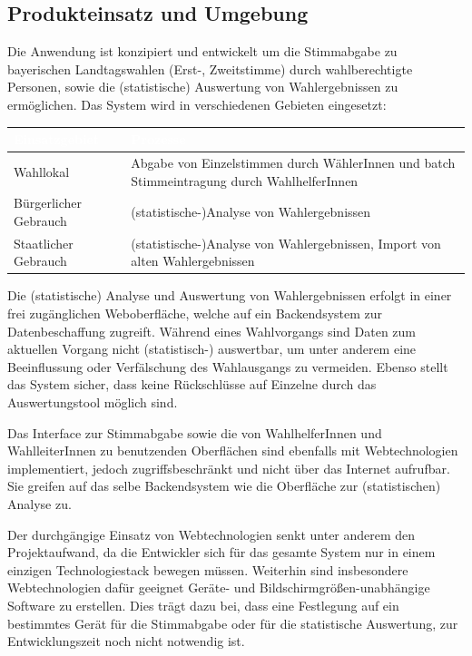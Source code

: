 \documentclass[a4paper,12pt]{article}
\begin{document}
\subsection{Produkteinsatz und Umgebung}
Die Anwendung ist konzipiert und entwickelt um die Stimmabgabe 
zu bayerischen Landtagswahlen (Erst-, Zweitstimme) durch wahlberechtigte
Personen, sowie die (statistische) Auswertung von Wahlergebnissen zu ermöglichen. 
%
Das System wird in verschiedenen Gebieten eingesetzt:

\begin{center}
\begin{tabular}{|m{5cm}|m{10cm}|}
	\hline
  \rowcolor{TUMBlue} \textcolor{white}{\textbf{Einsatzgebiet}} & \textcolor{white}{\textbf{Prozesse}} \\
  \hline
  Wahllokal & Abgabe von Einzelstimmen durch WählerInnen und batch Stimmeintragung durch WahlhelferInnen \\
	\hline
  Bürgerlicher Gebrauch & (statistische-)Analyse von Wahlergebnissen \\
  \hline
  Staatlicher Gebrauch & (statistische-)Analyse von Wahlergebnissen, Import von alten Wahlergebnissen \\
	\hline
\end{tabular}
\end{center}

Die (statistische) Analyse und Auswertung von Wahlergebnissen erfolgt in einer frei zugänglichen
Weboberfläche, welche auf ein Backendsystem zur Datenbeschaffung zugreift. 
Während eines Wahlvorgangs sind Daten zum aktuellen Vorgang nicht (statistisch-) auswertbar, um unter anderem eine Beeinflussung oder Verfälschung des Wahlausgangs zu vermeiden.
Ebenso stellt das System sicher, dass keine Rückschlüsse auf Einzelne durch das Auswertungstool
möglich sind.

Das Interface zur Stimmabgabe sowie die von WahlhelferInnen und WahlleiterInnen zu benutzenden Oberflächen sind 
ebenfalls mit Webtechnologien implementiert, jedoch zugriffsbeschränkt und nicht über das Internet aufrufbar. Sie greifen
auf das selbe Backendsystem wie die Oberfläche zur (statistischen) Analyse zu.

Der durchgängige Einsatz von Webtechnologien senkt unter anderem den Projektaufwand, da die Entwickler sich für das gesamte System nur in 
einem einzigen Technologiestack bewegen müssen. Weiterhin sind insbesondere 
Webtechnologien dafür geeignet Geräte- und Bildschirmgrößen-unabhängige Software zu erstellen. Dies trägt dazu bei, dass eine Festlegung auf ein bestimmtes Gerät für die Stimmabgabe oder für die statistische Auswertung, zur Entwicklungszeit noch nicht notwendig ist. 
\end{document}
